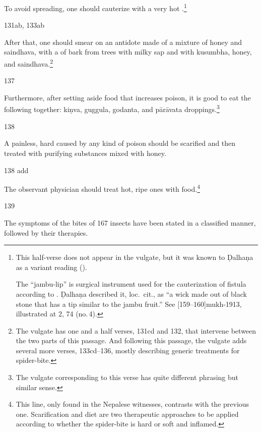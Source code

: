 \begin{translation}
To avoid spreading, one should cauterize with a very hot
.\footnote{This half-verse does not appear
    in the vulgate, but it was known to Ḍalhaṇa as a variant reading
    ().
    
    The “jambu-lip” is surgical instrument used for the
cauterization of fistula according to .  Ḍalhaṇa
described it, loc.\ cit., as  “a wick made out of black stone that
has a tip similar to the jambu fruit.”  See
[159--160]{mukh-1913}, illustrated at 2, 74 (no.\,4).}

\item[131ab, 133ab]

After that, one should smear on an antidote made of a mixture of honey and 
\gls{saindhava}, with a  of bark from trees with milky 
sap and with 
\gls{kusumbha}, 
honey, and
\gls{saindhava}.\footnote{The vulgate has one and a half verses, 131cd and 
132, that intervene between the two parts of this passage.  And following this 
passage, the vulgate adds several more verses, 133cd--136, mostly describing 
generic treatments for spider-bite.}


\item[137]

Furthermore, after setting aside food that increases poison,
it is good to eat the following together:
\gls{kiṇva},
\gls{guggula},
\gls{godanta}, and
\gls{pārāvata} droppings.\footnote{The vulgate corresponding to this verse 
has quite different phrasing but similar sense.}

\item[138]

A painless, hard  caused by any kind of poison should be 
scarified and then treated with purifying substances mixed with honey.

\item[138 add]
 
The observant physician should treat hot, ripe ones with food.\footnote{This 
line, only found in the Nepalese witnesses, contrasts with the previous one.  
Scarification and diet are two therapeutic approaches to be applied according to 
whether the spider-bite is hard or soft and inflamed.}
    
\item[139]

The symptoms of the bites of 167 insects have been stated
in a classified manner, followed by their therapies.


\end{translation}

